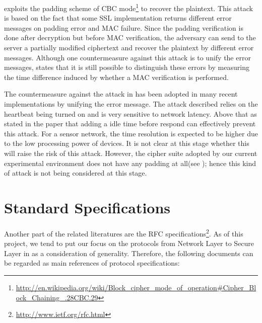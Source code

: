 \cite{DBLP:conf/eurocrypt/Vaudenay02} exploits the padding scheme of CBC mode\footnote{\url{http://en.wikipedia.org/wiki/Block_cipher_mode_of_operation\#Cipher_Block_Chaining_.28CBC.29}}
 to recover the plaintext. This attack is based on the fact that some SSL implementation returns different error messages on padding error and MAC failure. Since the padding verification is done after decryption but before MAC verification, the adversary can send to the server a partially modified ciphertext and recover the plaintext by different error messages. Although one countermeasure against this attack is to unify the error messages, \cite{DBLP:conf/sp/AlFardanP13} states that it is still possible to distinguish these errors by measuring the time difference induced by whether a MAC verification is performed.

The countermeasure against the attack in \cite{DBLP:conf/eurocrypt/Vaudenay02} has been adopted in many recent implementations by unifying the error message. The attack described \cite{DBLP:conf/sp/AlFardanP13} relies on the heartbeat being turned on and is very sensitive to network latency. Above that as stated in the paper that adding a idle time before respond can effectively prevent this attack. For a sensor network, the time resolution is expected to be higher due to the low processing power of devices. It is not clear at this stage whether this will raise the risk of this attack. However, the cipher suite adopted by our current experimental environment does not have any padding at all(see ); hence this kind of attack is not being considered at this stage.

\section{Standard Specifications}
Another part of the related literatures are the RFC specifications\footnote{\url{http://www.ietf.org/rfc.html}}. As of this project, we tend to put our focus on the protocols from Network Layer to Secure Layer in  as a consideration of generality. Therefore, the following documents can be regarded as main references of protocol specifications:

